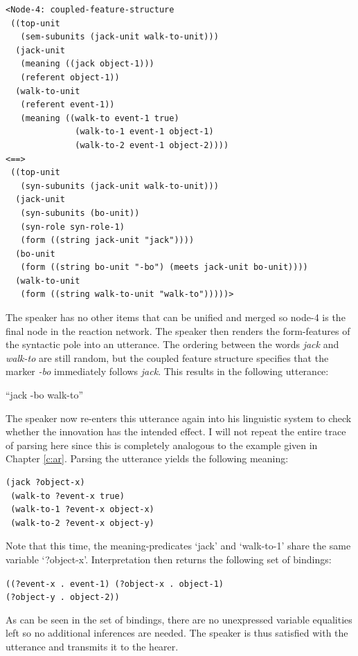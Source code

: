 \ea
\begin{lstlisting}
<Node-4: coupled-feature-structure
 ((top-unit
   (sem-subunits (jack-unit walk-to-unit)))
  (jack-unit
   (meaning ((jack object-1)))
   (referent object-1))
  (walk-to-unit
   (referent event-1))
   (meaning ((walk-to event-1 true)
              (walk-to-1 event-1 object-1)
              (walk-to-2 event-1 object-2))))
<==>
 ((top-unit
   (syn-subunits (jack-unit walk-to-unit)))
  (jack-unit
   (syn-subunits (bo-unit))
   (syn-role syn-role-1)
   (form ((string jack-unit "jack"))))
  (bo-unit
   (form ((string bo-unit "-bo") (meets jack-unit bo-unit))))
  (walk-to-unit
   (form ((string walk-to-unit "walk-to")))))>
\end{lstlisting}
\z


The speaker has no other items that can be unified and merged so node-4 is the final node in the reaction network. The speaker then renders the form-features of the syntactic pole into an utterance. The ordering between the words {\em jack} and {\em walk-to} are still random, but the coupled feature structure specifies that the marker {\em -bo} immediately follows {\em jack}. This results in the following utterance:

\ea
``jack -bo walk-to''
\z

The speaker now re-enters this utterance again into his linguistic system to check whether the innovation has the intended effect. I will not repeat the entire trace of parsing here since this is completely analogous to the example given in Chapter \ref{c:ar}. Parsing the utterance yields the following meaning:

\ea
\begin{lstlisting}
(jack ?object-x)
 (walk-to ?event-x true)
 (walk-to-1 ?event-x object-x)
 (walk-to-2 ?event-x object-y)
\end{lstlisting}
\z

Note that this time, the meaning-predicates `jack' and `walk-to-1' share the same variable `?object-x'. Interpretation then returns the following set of bindings:

\ea
{\footnotesize\tt{((?event-x . event-1) (?object-x . object-1) \\ \hspace{3,3mm}(?object-y . object-2))}}
\z

As can be seen in the set of bindings, there are no unexpressed variable equalities left so no additional inferences are needed. The speaker is thus satisfied with the utterance and transmits it to the hearer.


